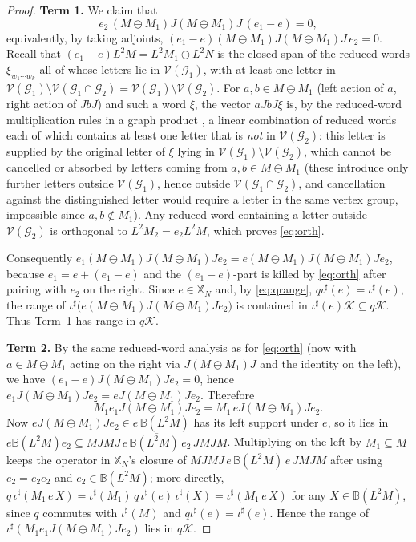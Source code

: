 \documentclass[a4paper, 11pt, reqno]{amsart}
\numberwithin{equation}{section}
\theoremstyle{plain}
\theoremstyle{remark}
\theoremstyle{definition}
\newcommand{\B}{\mathbb{B}}
\newcommand{\KK}{{\mathcal K}}
\newcommand{\XX}{{\mathbb{X}}}
\newcommand{\VV}{{\mathcal V}}
\newcommand{\GG}{{\mathcal G}}
\newcommand{\S}{\mathbb{S}}
\begin{document}
\begin{proof}
\medskip\noindent\textbf{Term 1.}
We claim that
\begin{equation}\label{eq:orth}
e_2\,(M\ominus M_1)J(M\ominus M_1)J\,(e_1-e)=0,
\end{equation}
equivalently, by taking adjoints, $(e_1-e)(M\ominus M_1)J(M\ominus M_1)J\,e_2=0$. Recall that $(e_1-e)L^2M=L^2M_1\ominus L^2N$ is the closed span of the reduced words $\xi_{w_1\cdots w_k}$ all of whose letters lie in $\VV(\GG_1)$, with at least one letter in $\VV(\GG_1)\setminus\VV(\GG_1\cap\GG_2)=\VV(\GG_1)\setminus\VV(\GG_2)$. For $a,b\in M\ominus M_1$ (left action of $a$, right action of $JbJ$) and such a word $\xi$, the vector $aJbJ\xi$ is, by the reduced-word multiplication rules in a graph product \cite[\S2]{CaFi17}, a linear combination of reduced words each of which contains at least one letter that is \emph{not} in $\VV(\GG_2)$: this letter is supplied by the original letter of $\xi$ lying in $\VV(\GG_1)\setminus\VV(\GG_2)$, which cannot be cancelled or absorbed by letters coming from $a,b\in M\ominus M_1$ (these introduce only further letters outside $\VV(\GG_1)$, hence outside $\VV(\GG_1\cap\GG_2)$, and cancellation against the distinguished letter would require a letter in the same vertex group, impossible since $a,b\notin M_1$). Any reduced word containing a letter outside $\VV(\GG_2)$ is orthogonal to $L^2M_2=e_2L^2M$, which proves \eqref{eq:orth}.

Consequently $e_1(M\ominus M_1)J(M\ominus M_1)Je_2=e(M\ominus M_1)J(M\ominus M_1)Je_2$, because $e_1=e+(e_1-e)$ and the $(e_1-e)$-part is killed by \eqref{eq:orth} after pairing with $e_2$ on the right. Since $e\in\XX_N$ and, by \eqref{eq:qrange}, $q\iota^\sharp(e)=\iota^\sharp(e)$, the range of $\iota^\sharp\big(e(M\ominus M_1)J(M\ominus M_1)Je_2\big)$ is contained in $\iota^\sharp(e)\KK\subseteq q\KK$. Thus Term~1 has range in $q\KK$.

\medskip\noindent\textbf{Term 2.}
By the same reduced-word analysis as for \eqref{eq:orth} (now with $a\in M\ominus M_1$ acting on the right via $J(M\ominus M_1)J$ and the identity on the left), we have $(e_1-e)J(M\ominus M_1)Je_2=0$, hence $e_1J(M\ominus M_1)Je_2=eJ(M\ominus M_1)Je_2$. Therefore
\[
M_1e_1J(M\ominus M_1)Je_2=M_1\,eJ(M\ominus M_1)Je_2 .
\]
Now $eJ(M\ominus M_1)Je_2\in e\,\B(L^2M)$ has its left support under $e$, so it lies in $e\B(L^2M)e_2\subseteq\overline{MJMJ\,e\,\B(L^2M)\,e_2\,JMJM}$. Multiplying on the left by $M_1\subseteq M$ keeps the operator in $\XX_N$'s closure of $MJMJ\,e\,\B(L^2M)\,e\,JMJM$ after using $e_2=e_2 e_2$ and $e_2\in\B(L^2M)$; more directly, $q\,\iota^\sharp(M_1\,e\,X)=\iota^\sharp(M_1)\,q\,\iota^\sharp(e)\,\iota^\sharp(X)=\iota^\sharp(M_1\,e\,X)$ for any $X\in\B(L^2M)$, since $q$ commutes with $\iota^\sharp(M)$ and $q\iota^\sharp(e)=\iota^\sharp(e)$. Hence the range of $\iota^\sharp(M_1e_1J(M\ominus M_1)Je_2)$ lies in $q\KK$.


\end{proof}
\end{document}
